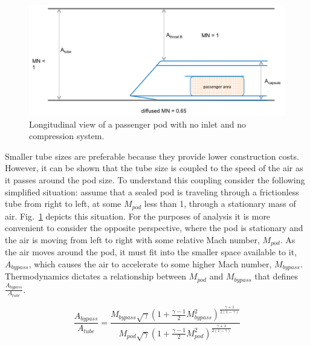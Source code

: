 \documentclass[heading.tex]{subfiles}
\begin{document}
\begin{figure}[hbtp]
\centering
\includegraphics[width=.85\textwidth]{images/closedCapsule}
\caption{Longitudinal view of a passenger pod with no inlet and no compression system.}
\label{f:ClosedPod}
\end{figure}

Smaller tube sizes are preferable because they provide lower construction costs. However, it can be shown that 
the tube size is coupled to the speed of the air as it passes around the pod size. 
To understand this coupling consider the following simplified situation: assume that a sealed pod
is traveling through a frictionless tube from right to left, at some $M_{pod}$ less than 1, through a stationary mass of air. 
Fig.~\ref{f:ClosedPod} depicts this situation. For the purposes of analysis it is more convenient to consider the opposite perspective, 
where the pod is stationary and the air is moving from left to right with some relative Mach number, $M_{pod}$. 
As the air moves around the pod, it must fit into the smaller space available to it, $A_{bypass}$, which causes the air 
to accelerate to some higher Mach number, $M_{bypass}$. Thermodynamics dictates a relationship between 
$M_{pod}$ and $M_{bypass}$ that defines $\frac{A_{bypass}}{A_{tube}}$.

\begin{equation}
\frac{A_{bypass}}{A_{tube}} = \frac{M_{bypass}\sqrt{\gamma}\left(1+ \frac{\gamma-1}{2} M_{bypass}^2\right)^{\frac{\gamma+1}{2\left(1-\gamma\right)}}}
{M_{pod}\sqrt{\gamma}\left(1+ \frac{\gamma-1}{2} M_{pod}^2\right)^{\frac{\gamma+1}{2\left(1-\gamma\right)}}}
\label{e:a-over-astar}
\end{equation}
\end{document}
